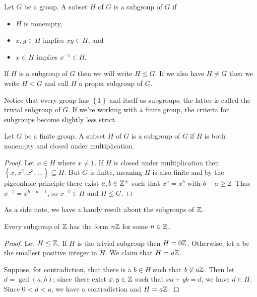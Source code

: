 \documentclass[../m171main.tex]{subfiles}
\begin{document}
\begin{definition}[Subgroup]
    Let $G$ be a group.
    A subset $H$ of $G$ is a subgroup of $G$ if
    \begin{itemize}
        \item $H$ is nonempty,
        \item $x,y \in H$ implies $xy \in H$, and
        \item $x \in H$ implies $x^{-1} \in H$.
    \end{itemize}
    If $H$ is a subgroup of $G$ then we will write $H \leq G$.
    If we also have $H \neq G$ then we write $H < G$ and call $H$ a proper subgroup of $G$.
\end{definition}

Notice that every group has $\left\{ 1 \right\}$ and itself as subgroups; the latter is called the trivial subgroup of $G$.
If we're working with a finite group, the criteria for subgroups become slightly less strict.

\begin{theorem}[]
    Let $G$ be a finite group.
    A subset $H$ of $G$ is a subgroup of $G$ if $H$ is both nonempty and closed under multiplication.
\end{theorem}

\begin{proof}
    Let $x \in H$ where $x \neq 1$.
    If $H$ is closed under multiplication then $\left\{ x, x^2, x^3, \ldots \right\} \subseteq H$.
    But $G$ is finite, meaning $H$ is also finite and by the pigeonhole principle there exist $a,b \in \mathbb{Z}^+$ such that $x^{a} = x^{b}$ with $b-a \geq 2$.
    Thus $x^{-1} = x^{b-a-1}$, so $x^{-1} \in H$ and $H \leq G$.
\end{proof}

As a side note, we have a handy result about the subgroups of $\mathbb{Z}$.

\begin{theorem}
    Every subgroup of $\mathbb{Z}$ has the form $n\mathbb{Z}$ for some $n \in \mathbb{Z}$.
\end{theorem}

\begin{proof}
    Let $H \leq \mathbb{Z}$.
    If $H$ is the trivial subgroup then $H = 0\mathbb{Z}$.
    Otherwise, let $a$ be the smallest positive integer in $H$.
    We claim that $H = a\mathbb{Z}$.

    Suppose, for contradiction, that there is a $b \in H$ such that $b \not\in a\mathbb{Z}$.
    Then let $d = \gcd(a,b)$; since there exist $x,y \in \mathbb{Z}$ such that $xa + yb = d$, we have $d \in H$.
    Since $0 < d < a$, we have a contradiction and $H = a\mathbb{Z}$.
\end{proof}
\end{document}
